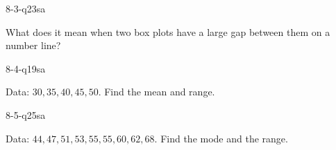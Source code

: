 \begin{practiceQuestion}{8-3-q23}{sa}
\begin{questionText}
What does it mean when two box plots have a large gap between them on a number line?
\end{questionText}
\end{practiceQuestion}

\begin{practiceQuestion}{8-4-q19}{sa}
\begin{questionText}
Data: $30, 35, 40, 45, 50$. Find the mean and range.
\end{questionText}
\end{practiceQuestion}

\begin{practiceQuestion}{8-5-q25}{sa}
\begin{questionText}
Data: $44, 47, 51, 53, 55, 55, 60, 62, 68$. Find the mode and the range.
\end{questionText}
\end{practiceQuestion}

